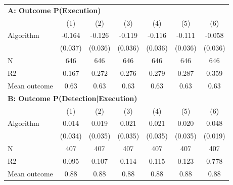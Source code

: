 \begin{tabular}{lcccccc} \toprule
\multicolumn{7}{l}{\textbf{A: Outcome P(Execution)}} \\ \multicolumn{1}{l}{} & (1) & (2) & (3) & (4) & (5) & (6) \\ \midrule
Algorithm   &      -0.164\sym{***}&      -0.126\sym{***}&      -0.119\sym{***}&      -0.116\sym{***}&      -0.111\sym{***}&      -0.058         \\
            &     (0.037)         &     (0.036)         &     (0.036)         &     (0.036)         &     (0.036)         &     (0.036)         \\
\midrule
N           &         646         &         646         &         646         &         646         &         646         &         646         \\
R2          &       0.167         &       0.272         &       0.276         &       0.279         &       0.287         &       0.359         \\
Mean outcome&        0.63         &        0.63         &        0.63         &        0.63         &        0.63         &        0.63         \\

\midrule \multicolumn{7}{l}{\textbf{B: Outcome P(Detection|Execution)}} \\ \multicolumn{1}{l}{} & (1) & (2) & (3) & (4) & (5) & (6) \\ \midrule
Algorithm   &       0.014         &       0.019         &       0.021         &       0.021         &       0.020         &       0.048\sym{**} \\
            &     (0.034)         &     (0.035)         &     (0.035)         &     (0.035)         &     (0.035)         &     (0.019)         \\
\midrule
N           &         407         &         407         &         407         &         407         &         407         &         407         \\
R2          &       0.095         &       0.107         &       0.114         &       0.115         &       0.123         &       0.778         \\
Mean outcome&        0.88         &        0.88         &        0.88         &        0.88         &        0.88         &        0.88         \\


\end{tabular}
